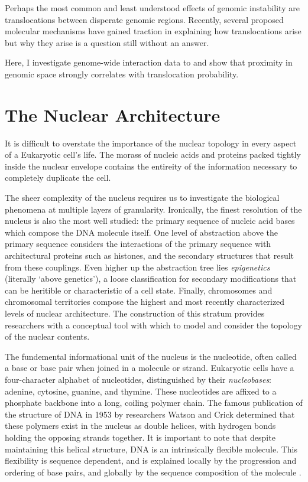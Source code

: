 \documentclass[phd,tocprelim]{cornell}
\begin{document}
Perhaps the most common and least understood effects of genomic instability are
translocations between disperate genomic regions.  Recently, several proposed
molecular mechanisms have gained traction in explaining how translocations arise
but why they arise is a question still without an answer.

Here, I investigate genome-wide interaction data to and show that proximity in
genomic space strongly correlates with translocation probability.

\chapter{The Nuclear Architecture}

It is difficult to overstate the importance of the nuclear topology in
every aspect of a Eukaryotic cell's life.  The morass of nucleic acids and
proteins packed tightly inside the nuclear envelope contains the entireity of
the information necessary to completely duplicate the cell.

The sheer complexity of the nucleus requires us to investigate the biological
phenomena at multiple layers of granularity.  Ironically, the finest resolution
of the nucleus is also the most well studied: the primary sequence of nucleic
acid bases which compose the DNA molecule itself.  One level of abstraction
above the primary sequence considers the interactions of the primary sequence
with architectural proteins such as histones, and the secondary structures that
result from these couplings.  Even higher up the abstraction tree lies
\textit{epigenetics} (literally `above genetics'\cite{dictepi2014}), a loose
classification for secondary modifications that can be heritible or characteristic
of a cell state.  Finally, chromosomes and chromosomal territories compose the
highest and most recently characterized levels of nuclear architecture.  The
construction of this stratum provides researchers with a conceptual tool with
which to model and consider the topology of the nuclear contents.

The fundemental informational unit of the nucleus is the nucleotide, often
called a base or base pair when joined in a molecule or strand.  Eukaryotic
cells have a four-character alphabet of nucleotides, distinguished by their
\textit{nucleobases}: adenine, cytosine, guanine, and thymine.  These
nucleotides are affixed to a phosphate backbone into a long, coiling polymer
chain.  The famous publication of the structure of DNA in 1953 by researchers
Watson and Crick determined that these polymers exist in the nucleus as double
helices\cite{watson1953}, with hydrogen bonds holding the opposing strands
together.  It is important to note that despite maintaining this helical
structure, DNA is an intrinsically flexible molecule.  This flexibility
is sequence dependent, and is explained locally by the progression and ordering
of base pairs, and globally by the sequence composition of the molecule%
\cite{travers2004}.  
\end{document}

